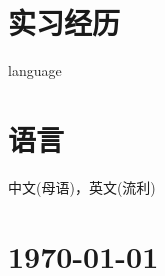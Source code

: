 \documentclass{article}
\begin{document}
\section*{实习经历}
\indent





language
\section*{语言}
\indent

中文(母语)，英文(流利)


\vfill

\section*{\hfill\color{OliveGreen}\today}
\end{document}

